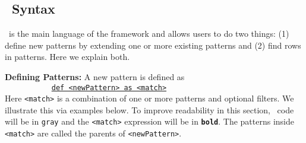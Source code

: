 \subsection{\dsl~Syntax}
\label{description}

\dsl~is the main language of the framework and allows users to do two things: (1) define new patterns by extending one or more existing patterns and (2) find rows in patterns. Here we explain both. 

\textbf{Defining Patterns:}
\label{def}
	A new pattern is defined as \\
\texttt{\phantom{1}~~~~~~~~~~~\small \underline{def <newPattern> as <match>}}\\
	Here \texttt{<match>} is a combination of one or more patterns and optional filters. We illustrate this via examples below. To improve readability in this section, \dsl~code will be in \colorbox{Light}{\small \texttt{gray}} and %
	the \texttt{<match>} expression will be in \colorbox{Light}{\small \texttt{\bfseries{bold}}}. The patterns inside \texttt{<match>} are called the parents of \texttt{<newPattern>}. 
	
